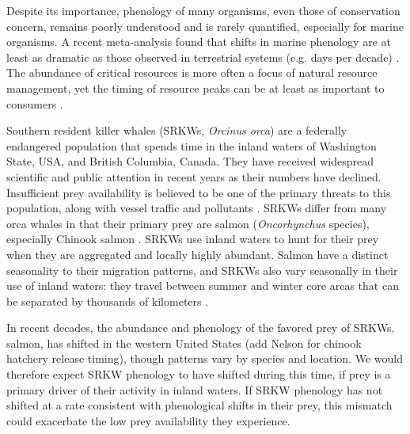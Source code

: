 \documentclass{article}
\begin{document}
\par Despite its importance, phenology of many organisms, even those of conservation concern, remains poorly understood and is rarely quantified, especially for marine organisms. A recent meta-analysis found that shifts in marine phenology are at least as dramatic as those observed in terrestrial systems (e.g.  days per decade) \citep{poloczanska2013}. The abundance of critical resources is more often a focus of natural resource management, yet the timing of resource peaks can be at least as important to consumers \citep{hipfner2008}.
\par Southern resident killer whales (SRKWs, \emph{Orcinus orca}) are a federally endangered population that spends time in the inland waters of Washington State, USA, and British Columbia, Canada.  They have received widespread scientific and public attention in recent years as their numbers have declined\citep[e.g., Seattle Times articles,][]{lusseau2009,larson2018, olson2018}. Insufficient prey availability is believed to be one of the primary threats to this population, along with vessel traffic and pollutants \citep{krahn2007,lusseau2009,hanson2010}. SRKWs differ from many orca whales in that their primary prey are salmon (\emph{Oncorhynchus} species), especially Chinook salmon \citep[\emph{Oncorhynchus tshawytscha}][]{hanson2010}. SRKWs use inland waters to hunt for their prey when they are aggregated and locally highly abundant. Salmon have a distinct seasonality to their migration patterns,  and SRKWs also vary seasonally in their use of inland waters: they travel between summer and winter core areas that can be separated by thousands of kilometers \citep{balcomb1986,krahn2004}. 
\par In recent decades, the abundance and phenology of the favored prey of SRKWs, salmon, has shifted in the western United States \citep{weinheimer2017,reed2011,ford2006,satterthwaite2014}(add Nelson for chinook hatchery release timing), though patterns vary by species and location. We would therefore expect SRKW phenology to have shifted during this time, if prey is a primary driver of their activity in inland waters. If SRKW phenology has not shifted at a rate consistent with phenological shifts in their prey, this mismatch could exacerbate the low prey availability they experience. 
\end{document}
